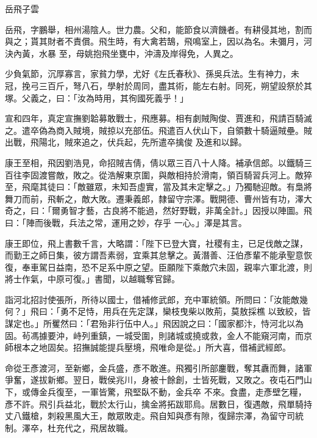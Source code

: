 
\begin{pinyinscope}

 岳飛子雲



 岳飛，字鵬舉，相州湯陰人。世力農。父和，能節食以濟饑者。有耕侵其地，割而與之；貰其財者不責償。飛生時，有大禽若鵠，飛鳴室上，因以為名。未彌月，河決內黃，水暴
 至，母姚抱飛坐甕中，沖濤及岸得免，人異之。



 少負氣節，沉厚寡言，家貧力學，尤好《左氏春秋》、孫吳兵法。生有神力，未冠，挽弓三百斤，弩八石，學射於周同，盡其術，能左右射。同死，朔望設祭於其塚。父義之，曰：「汝為時用，其徇國死義乎！」



 宣和四年，真定宣撫劉韐募敢戰士，飛應募。相有劇賊陶俊、賈進和，飛請百騎滅之。遣卒偽為商入賊境，賊掠以充部伍。飛遣百人伏山下，自領數十騎逼賊壘。賊出戰，飛陽北，賊來追之，伏兵起，先所遣卒擒俊
 及進和以歸。



 康王至相，飛因劉浩見，命招賊吉倩，倩以眾三百八十人降。補承信郎。以鐵騎三百往李固渡嘗敵，敗之。從浩解東京圍，與敵相持於滑南，領百騎習兵河上。敵猝至，飛麾其徒曰：「敵雖眾，未知吾虛實，當及其未定擊之。」乃獨馳迎敵。有梟將舞刀而前，飛斬之，敵大敗。遷秉義郎，隸留守宗澤。戰開德、曹州皆有功，澤大奇之，曰：「爾勇智才藝，古良將不能過，然好野戰，非萬全計。」因授以陣圖。飛曰：「陣而後戰，兵法之常，運用之妙，存乎
 一心。」澤是其言。



 康王即位，飛上書數千言，大略謂：「陛下已登大寶，社稷有主，已足伐敵之謀，而勤王之師日集，彼方謂吾素弱，宜乘其怠擊之。黃潛善、汪伯彥輩不能承聖意恢復，奉車駕日益南，恐不足系中原之望。臣願陛下乘敵穴未固，親率六軍北渡，則將士作氣，中原可復。」書聞，以越職奪官歸。



 詣河北招討使張所，所待以國士，借補修武郎，充中軍統領。所問曰：「汝能敵幾何？」飛曰：「勇不足恃，用兵在先定謀，欒枝曳柴以敗荊，莫敖採樵
 以致絞，皆謀定也。」所矍然曰：「君殆非行伍中人。」飛因說之曰：「國家都汴，恃河北以為固。茍馮據要沖，峙列重鎮，一城受圍，則諸城或撓或救，金人不能窺河南，而京師根本之地固矣。招撫誠能提兵壓境，飛唯命是從。」所大喜，借補武經郎。



 命從王彥渡河，至新鄉，金兵盛，彥不敢進。飛獨引所部鏖戰，奪其纛而舞，諸軍爭奮，遂拔新鄉。翌日，戰侯兆川，身被十餘創，士皆死戰，又敗之。夜屯石門山下，或傳金兵復至，一軍皆驚，飛堅臥不動，金兵卒
 不來。食盡，走彥壁乞糧，彥不許。飛引兵益北，戰於太行山，擒金將拓跋耶烏。居數日，復遇敵，飛單騎持丈八鐵槍，刺殺黑風大王，敵眾敗走。飛自知與彥有隙，復歸宗澤，為留守司統制。澤卒，杜充代之，飛居故職。




\end{pinyinscope}
